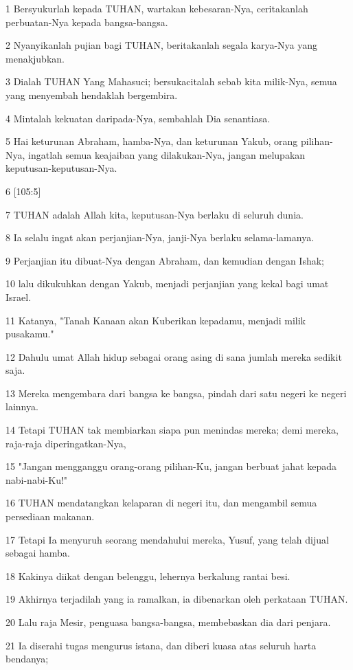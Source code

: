 \par 1 Bersyukurlah kepada TUHAN, wartakan kebesaran-Nya, ceritakanlah perbuatan-Nya kepada bangsa-bangsa.
\par 2 Nyanyikanlah pujian bagi TUHAN, beritakanlah segala karya-Nya yang menakjubkan.
\par 3 Dialah TUHAN Yang Mahasuci; bersukacitalah sebab kita milik-Nya, semua yang menyembah hendaklah bergembira.
\par 4 Mintalah kekuatan daripada-Nya, sembahlah Dia senantiasa.
\par 5 Hai keturunan Abraham, hamba-Nya, dan keturunan Yakub, orang pilihan-Nya, ingatlah semua keajaiban yang dilakukan-Nya, jangan melupakan keputusan-keputusan-Nya.
\par 6 [105:5]
\par 7 TUHAN adalah Allah kita, keputusan-Nya berlaku di seluruh dunia.
\par 8 Ia selalu ingat akan perjanjian-Nya, janji-Nya berlaku selama-lamanya.
\par 9 Perjanjian itu dibuat-Nya dengan Abraham, dan kemudian dengan Ishak;
\par 10 lalu dikukuhkan dengan Yakub, menjadi perjanjian yang kekal bagi umat Israel.
\par 11 Katanya, "Tanah Kanaan akan Kuberikan kepadamu, menjadi milik pusakamu."
\par 12 Dahulu umat Allah hidup sebagai orang asing di sana jumlah mereka sedikit saja.
\par 13 Mereka mengembara dari bangsa ke bangsa, pindah dari satu negeri ke negeri lainnya.
\par 14 Tetapi TUHAN tak membiarkan siapa pun menindas mereka; demi mereka, raja-raja diperingatkan-Nya,
\par 15 "Jangan mengganggu orang-orang pilihan-Ku, jangan berbuat jahat kepada nabi-nabi-Ku!"
\par 16 TUHAN mendatangkan kelaparan di negeri itu, dan mengambil semua persediaan makanan.
\par 17 Tetapi Ia menyuruh seorang mendahului mereka, Yusuf, yang telah dijual sebagai hamba.
\par 18 Kakinya diikat dengan belenggu, lehernya berkalung rantai besi.
\par 19 Akhirnya terjadilah yang ia ramalkan, ia dibenarkan oleh perkataan TUHAN.
\par 20 Lalu raja Mesir, penguasa bangsa-bangsa, membebaskan dia dari penjara.
\par 21 Ia diserahi tugas mengurus istana, dan diberi kuasa atas seluruh harta bendanya;

